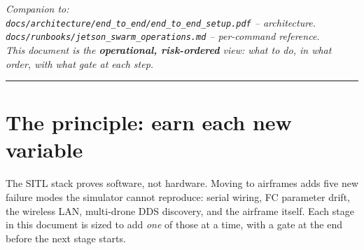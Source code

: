 \documentclass[11pt,a4paper]{article}
\begin{document}
\begin{center}
\end{center}

\vfill
\noindent\textit{Companion to:\\
\texttt{docs/architecture/end\_to\_end/end\_to\_end\_setup.pdf} -- architecture.\\
\texttt{docs/runbooks/jetson\_swarm\_operations.md} -- per-command reference.\\[4pt]
This document is the {\bfseries operational, risk-ordered} view: what to do,
in what order, with what gate at each step.}

\vspace{0.5cm}
\hrule

\newpage

\tableofcontents
\thispagestyle{fancy}
\newpage

\section{The principle: earn each new variable}

The SITL stack proves software, not hardware. Moving to airframes adds five
new failure modes the simulator cannot reproduce: serial wiring, FC parameter
drift, the wireless LAN, multi-drone DDS discovery, and the airframe itself.
Each stage in this document is sized to add \emph{one} of those at a time,
with a gate at the end before the next stage starts.
\end{document}
